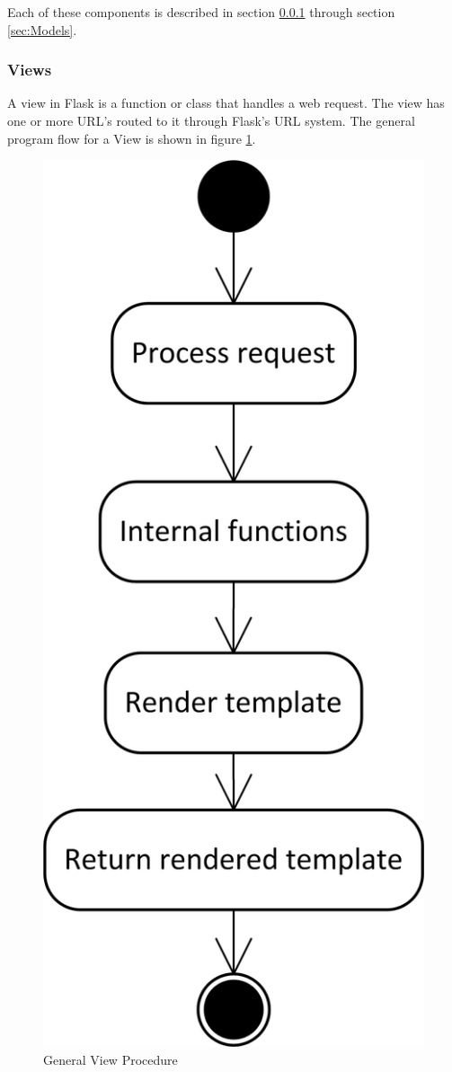 \documentclass{article}
\begin{document}
Each of these components is described in section \ref{sec:Views} through section \ref{sec:Models}.

\subsubsection{Views}
\label{sec:Views}

A view in Flask is a function or class that handles a web request. The view has one or more URL's routed to it through Flask's URL system. The general program flow for a View is shown in figure \ref{fig:ViewProgramFlow}.

\FloatBarrier
\begin{figure}[h!]
\centering
\includegraphics[scale=.75]{img/viewProcedureDiagram}
\caption{General View Procedure}
\label{fig:ViewProgramFlow}
\end{figure}
\FloatBarrier
\end{document}
